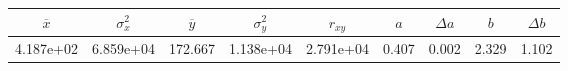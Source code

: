 \begin{tabular}{ccccccccc}
\toprule
$\overline{x}$ & $\sigma_x^2$ & $\overline{y}$ & $\sigma_y^2$ & $r_{xy}$ & $a$ & $\Delta a$ & $b$ & $\Delta b$ \\
\midrule
4.187e+02 & 6.859e+04 & 172.667 & 1.138e+04 & 2.791e+04 & 0.407 & 0.002 & 2.329 & 1.102 \\
\bottomrule
\end{tabular}
